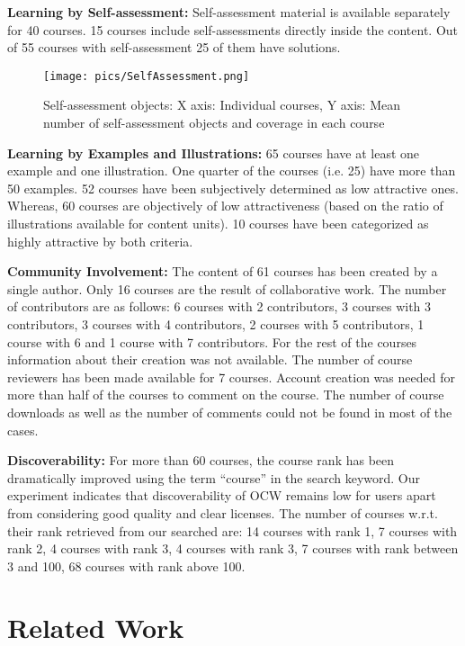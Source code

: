 \documentclass{sig-alternate}
\let\ednote\Ednote
\theoremstyle{definition}
\begin{document}
\noindent\textbf{Learning by Self-assessment:}
Self-assessment material is available separately for 40 courses.
15 courses include self-assessments directly inside the content. 
Out of 55 courses with self-assessment 25 of them have solutions. 

\begin{figure}[h]
\texttt{[image: pics/SelfAssessment.png]}
\caption{Self-assessment objects: X axis: Individual courses, Y axis: Mean number of self-assessment objects and coverage in each course}
\label{fig:Self-assessment}
\end{figure}

\noindent\textbf{Learning by Examples and Illustrations:}
65 courses have at least one example and one illustration.
One quarter of the courses (i.e. 25) have more than 50 examples.
52 courses have been subjectively determined as low attractive ones.
Whereas, 60 courses are objectively of low attractiveness (based on the ratio of illustrations available for content units).
10 courses have been categorized as highly attractive by both criteria.

\noindent\textbf{Community Involvement:}
The content of 61 courses has been created by a single author.
Only 16 courses are the result of collaborative work.
The number of contributors are as follows:
6 courses with 2 contributors, 
3 courses with 3 contributors, 
3 courses with 4 contributors, 
2 courses with 5 contributors, 
1 course with 6 and 
1 course with 7 contributors. 
\ednote{edit}
For the rest of the courses information about their creation was not available.
The number of course reviewers has been made available for 7 courses.
Account creation was needed for more than half of the courses to comment on the course. 
The number of course downloads as well as the number of comments could not be found in most of the cases.

\noindent\textbf{Discoverability:}
For more than 60 courses, the course rank has been dramatically improved using the term ``course'' in the search keyword.
Our experiment indicates that discoverability of OCW remains low for users apart from considering good quality and clear licenses.
The number of courses w.r.t. their rank retrieved from our searched are:
14 courses with rank 1, 
7 courses with rank 2,
4 courses with rank 3,
4 courses with rank 3,
7 courses with rank between 3 and 100,
68 courses with rank above 100.



\noindent\section{Related Work}
\label{sec:background-work}
\end{document}
